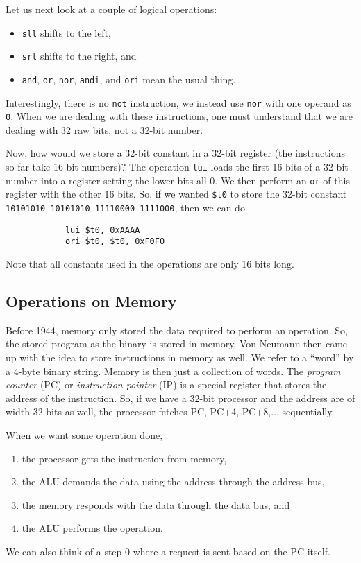 \documentclass{article}
\begin{document}
		Let us next look at a couple of logical operations:
		\begin{itemize}
			\item \texttt{sll} shifts to the left,
			\item \texttt{srl} shifts to the right, and
			\item \texttt{and}, \texttt{or}, \texttt{nor}, \texttt{andi}, and \texttt{ori} mean the usual thing.
		\end{itemize}
		Interestingly, there is no \texttt{not} instruction, we instead use \texttt{nor} with one operand as \texttt{0}. When we are dealing with these instructions, one must understand that we are dealing with 32 raw bits, not a 32-bit number. 

		Now, how would we store a 32-bit constant in a 32-bit register (the instructions so far take 16-bit numbers)? The operation \texttt{lui} loads the first 16 bits of a 32-bit number into a register setting the lower bits all 0. We then perform an \texttt{or} of this register with the other 16 bits. So, if we wanted \texttt{\$t0} to store the 32-bit constant \texttt{10101010 10101010 11110000 1111000}, then we can do
		\begin{verbatim}
			lui $t0, 0xAAAA
			ori $t0, $t0, 0xF0F0
		\end{verbatim}
		Note that all constants used in the operations are only 16 bits long.

	\subsection{Operations on Memory}

		Before 1944, memory only stored the data required to perform an operation. So, the stored program as the binary is stored in memory. Von Neumann then came up with the idea to store instructions in memory as well. We refer to a ``word'' by a 4-byte binary string. Memory is then just a collection of words. The \textit{program counter} (PC) or \textit{instruction pointer} (IP) is a special register that stores the address of the instruction. So, if we have a 32-bit processor and the address are of width 32 bits as well, the processor fetches PC, PC+4, PC+8,$\ldots$ sequentially.

		When we want some operation done,
		\begin{enumerate}
			\item the processor gets the instruction from memory,
			\item the ALU demands the data using the address through the address bus,
			\item the memory responds with the data through the data bus, and
			\item the ALU performs the operation.
		\end{enumerate}
		We can also think of a step 0 where a request is sent based on the PC itself.
\end{document}

